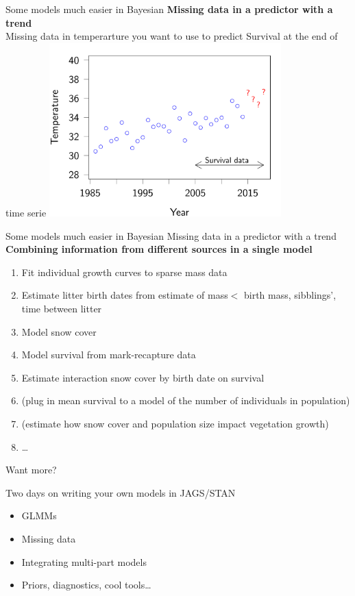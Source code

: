 \documentclass[10pt]{beamer}\usepackage[]{graphicx}\usepackage[]{color}
\newenvironment{knitrout}{}{} %
\begin{document}
\begin{frame}{Some models much easier in Bayesian}
\textbf{Missing data in a predictor with a trend\\}
\pause
Missing data in temperarture you want to use to predict Survival at the end of time serie
\begin{knitrout}\small
{}\color{fgcolor}
\includegraphics[width=0.67\textwidth,height=0.5\textwidth]{figure/tempmiss-1} 

\end{knitrout}

\end{frame}


\begin{frame}{Some models much easier in Bayesian}
Missing data in a predictor with a trend\\
\textbf{Combining information from different sources in a single model\\}
\pause

\begin{enumerate}[<+->]
  \item Fit individual growth curves to sparse mass data
  \item Estimate litter birth dates from estimate of mass$<$ birth mass, sibblings', time between litter
  \item Model snow cover 
  \item Model survival from mark-recapture data
  \item Estimate interaction snow cover by birth date on survival
  \item (plug in mean survival to a model of the number of individuals in population)
  \item (estimate how snow cover and population size impact vegetation growth)
  \item \dots
\end{enumerate}

\end{frame}

\begin{frame}{Want more?}

Two days on writing your own models in JAGS/STAN
  \begin{itemize}
    \item GLMMs
    \item Missing data
    \item Integrating multi-part models
    \item Priors, diagnostics, cool tools\dots
  \end{itemize}
  
\end{frame}
\end{document}
